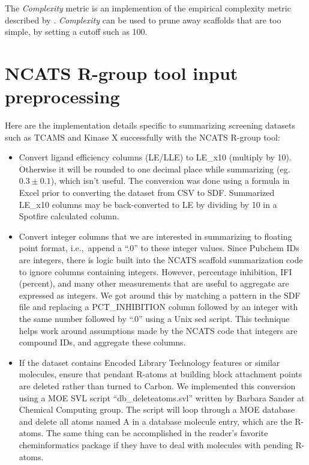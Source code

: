 \documentclass[11pt,letterpaper]{article}
\newcommand*\ie{i.e.,~}
\begin{document}
The \textit{Complexity} metric is an implemention of the empirical
complexity metric described by \citet{Barone2001}.
\textit{Complexity} can be used to prune away scaffolds that are too
simple, by setting a cutoff such as 100.

\newpage 

\section{NCATS R-group tool input preprocessing}
\label{sec:ncats-prepro}
Here are the implementation details specific to summarizing screening datasets such as TCAMS and Kinase X successfully with the NCATS R-group tool:
\begin{itemize}

\item Convert ligand efficiency columns (LE/LLE) to LE\_x10 (multiply by 10). Otherwise it will be rounded to one decimal place while summarizing (eg. $0.3 \pm  0.1$), which isn't useful. The conversion was done using a formula in Excel prior to converting the dataset from CSV to SDF. Summarized LE\_x10 columns may be back-converted to LE by dividing by 10 in a Spotfire calculated column.  

\item Convert integer columns that we are interested in summarizing to floating point format, \ie append a ``.0'' to these integer values. Since Pubchem IDs are integers, there is logic built into the NCATS scaffold summarization code to ignore columns containing integers. However, percentage inhibition, IFI (percent), and many other measurements that are useful to aggregate are expressed as integers.  We got around this by matching a pattern in the SDF file and replacing a PCT\_INHIBITION column followed by an integer with the same number followed by ``.0'' using a Unix sed script. This technique helps work around assumptions made by the NCATS code that integers are compound IDs, and aggregate these columns.
  
\item If the dataset contains Encoded Library Technology features or similar molecules, ensure that pendant  R-atoms  at building block attachment points are deleted rather than turned to Carbon. We implemented this conversion using a MOE SVL script ``db\_deleteatoms.svl'' written by Barbara Sander at Chemical Computing group. The script will loop through a MOE database and delete all atoms named  A  in a database molecule entry, which are the R-atoms. The same thing can be accomplished in the reader's favorite cheminformatics package if they have to deal with molecules with pending R-atoms.  
\end{itemize}
\end{document}
